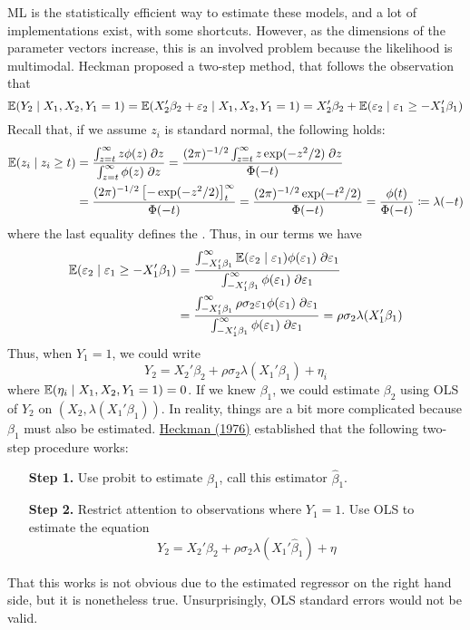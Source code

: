 \documentclass[10pt]{article}
\begin{document}
\begin{example}
	 ML is the statistically efficient way to estimate these models, and a lot of implementations exist, with some shortcuts. However, as the dimensions of the parameter vectors increase, this is an involved problem because the likelihood is multimodal. Heckman proposed a two-step method, that follows the observation that \[\mathbb{E}(Y_2 \mid X_1,X_2,Y_1 = 1) = \mathbb{E}(X_2'\beta_2 + \varepsilon_2 \mid X_1,X_2,Y_1 = 1) = X_2'\beta_2 + \mathbb{E}(\varepsilon_2 \mid \varepsilon_1 \ge -X_1'\beta_1)\]Recall that, if we assume $z_i$ is standard normal, the following holds:
	\begin{align*}
		\mathbb{E}(z_i \mid z_i \ge t) &= \frac{\int_{z=t}^\infty z\phi(z)\;\partial z}{\int_{z=t}^\infty \phi(z)\;\partial z} = \frac{(2\pi)^{-1/2} \int_{z=t}^\infty z \exp(-z^2 / 2) \;\partial z}{\Phi(-t)} \\
		&= \frac{(2\pi)^{-1/2} \left[ -\exp(-z^2 / 2)\right]_t^\infty}{\Phi(-t)} = \frac{(2\pi)^{-1/2} \exp(-t^2 / 2)}{\Phi(-t)} = \frac{\phi(t)}{\Phi(-t)} \coloneqq \lambda(-t)
	\end{align*}
	where the last equality defines the . Thus, in our terms we have 
	\begin{align*}
		\mathbb{E}(\varepsilon_2 \mid \varepsilon_1 \ge -X_1'\beta_1) &= \frac{\int_{-X_1'\beta_1}^\infty \mathbb{E}(\varepsilon_2 \mid \varepsilon_1) \phi(\varepsilon_1) \;\partial \varepsilon_1}{\int_{-X_1'\beta_1}^\infty  \phi(\varepsilon_1) \;\partial \varepsilon_1} \\
		&= \frac{\int_{-X_1'\beta_1}^\infty\rho \sigma_2\varepsilon_1 \phi(\varepsilon_1) \;\partial \varepsilon_1}{\int_{-X_1'\beta_1}^\infty  \phi(\varepsilon_1) \;\partial \varepsilon_1} = \rho \sigma_2 \lambda(X_1'\beta_1)
	\end{align*}
	Thus, when $Y_1 = 1$, we could write\[Y_2 = X_2'\beta_2 + \rho \sigma_2 \lambda(X_1'\beta_1)+\eta_i\]where $\mathbb{E}(\eta_i \mid X_1,X_2,Y_1=1) = 0$. If we knew $\beta_1$, we could estimate $\beta_2$ using OLS of $Y_2$ on $(X_2,\lambda(X_1'\beta_1))$. In reality, things are a bit more complicated because $\beta_1$ must also be estimated. \href{https://www.nber.org/system/files/chapters/c10491/c10491.pdf}{Heckman (1976)} established that the following two-step procedure works:
	\begin{itemize}
		\item[\textbf{Step 1.}] Use probit to estimate $\beta_1$, call this estimator $\hat{\beta}_1$. 
		\item[\textbf{Step 2.}] Restrict attention to observations where $Y_1 = 1$. Use OLS to estimate the equation\[Y_2 = X_2'\beta_2 + \rho \sigma_2 \lambda(X_1'\hat{\beta}_1) + \eta\]
	\end{itemize}
	That this works is not obvious due to the estimated regressor on the right hand side, but it is nonetheless true. Unsurprisingly, OLS standard errors would not be valid.
	

\end{example}
\end{document}
